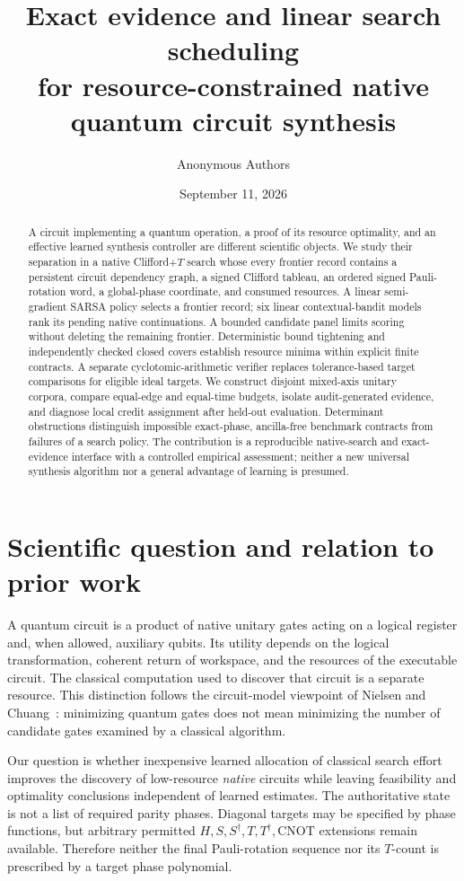 \documentclass[11pt]{article}
\title{Exact evidence and linear search scheduling\\for resource-constrained native quantum circuit synthesis}
\author{Anonymous Authors}
\date{September 11, 2026}
\newcommand{\CX}{\mathrm{CNOT}}
\begin{document}
\maketitle
\begin{abstract}
A circuit implementing a quantum operation, a proof of its resource optimality, and an effective learned synthesis controller are different scientific objects. We study their separation in a native Clifford+$T$ search whose every frontier record contains a persistent circuit dependency graph, a signed Clifford tableau, an ordered signed Pauli-rotation word, a global-phase coordinate, and consumed resources. A linear semi-gradient SARSA policy selects a frontier record; six linear contextual-bandit models rank its pending native continuations. A bounded candidate panel limits scoring without deleting the remaining frontier. Deterministic bound tightening and independently checked closed covers establish resource minima within explicit finite contracts. A separate cyclotomic-arithmetic verifier replaces tolerance-based target comparisons for eligible ideal targets. We construct disjoint mixed-axis unitary corpora, compare equal-edge and equal-time budgets, isolate audit-generated evidence, and diagnose local credit assignment after held-out evaluation. Determinant obstructions distinguish impossible exact-phase, ancilla-free benchmark contracts from failures of a search policy. 
The contribution is a reproducible native-search and exact-evidence interface with a controlled empirical assessment; neither a new universal synthesis algorithm nor a general advantage of learning is presumed.
\end{abstract}

\section{Scientific question and relation to prior work}
A quantum circuit is a product of native unitary gates acting on a logical register and, when allowed, auxiliary qubits. Its utility depends on the logical transformation, coherent return of workspace, and the resources of the executable circuit. The classical computation used to discover that circuit is a separate resource. This distinction follows the circuit-model viewpoint of Nielsen and Chuang~\cite{nielsen}: minimizing quantum gates does not mean minimizing the number of candidate gates examined by a classical algorithm.

Our question is whether inexpensive learned allocation of classical search effort improves the discovery of low-resource \emph{native} circuits while leaving feasibility and optimality conclusions independent of learned estimates. The authoritative state is not a list of required parity phases. Diagonal targets may be specified by phase functions, but arbitrary permitted $H,S,S^\dagger,T,T^\dagger,\CX$ extensions remain available. Therefore neither the final Pauli-rotation sequence nor its $T$-count is prescribed by a target phase polynomial.
\end{document}
